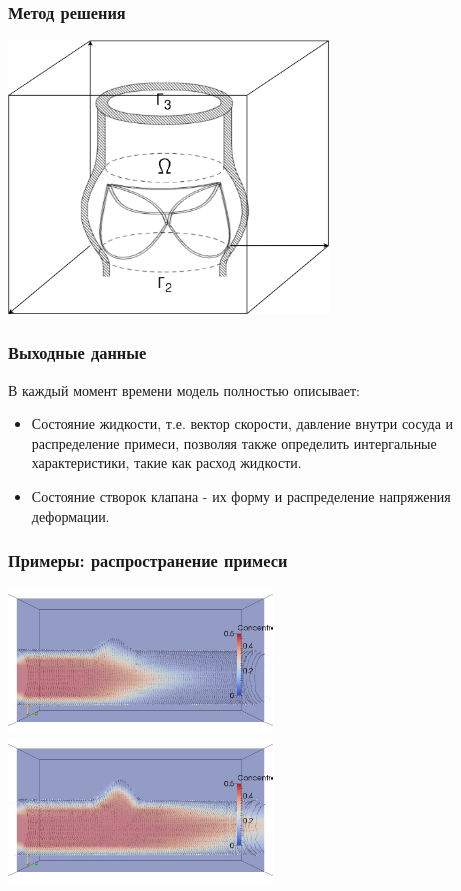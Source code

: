 \documentclass[14pt]{beamer}
\begin{document}
\begin{frame}
\frametitle{Метод решения}
    \begin{center}
        \includegraphics[width=8.5cm]{aorta_valve_scheme_framed.png}
    \end{center}
\end{frame}

\begin{frame}
\frametitle{Выходные данные}
В каждый момент времени модель полностью описывает:

\begin{itemize}
    \item[\MVRightarrow] Состояние жидкости, т.е. вектор скорости, давление
        внутри сосуда и распределение примеси, позволяя также определить
        интергальные характеристики, такие как расход жидкости.
    \item[\MVRightarrow] Состояние створок клапана - их форму и распределение
        напряжения деформации.
\end{itemize}

\end{frame}

\begin{frame}
\frametitle{Примеры: распространение примеси}
    \begin{center}
        \vspace{-1.40mm}
        \includegraphics[width=7cm]{source_in_vessel_1.png}
        \vspace{0.40mm}
        \includegraphics[width=7cm]{source_in_vessel_2.png}
    \end{center}
\end{frame}
\end{document}
